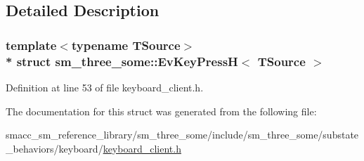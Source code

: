 \subsection{Detailed Description}
\subsubsection*{template$<$typename T\+Source$>$\\*
struct sm\+\_\+three\+\_\+some\+::\+Ev\+Key\+Press\+H$<$ T\+Source $>$}



Definition at line 53 of file keyboard\+\_\+client.\+h.



The documentation for this struct was generated from the following file\+:\begin{DoxyCompactItemize}
\item 
smacc\+\_\+sm\+\_\+reference\+\_\+library/sm\+\_\+three\+\_\+some/include/sm\+\_\+three\+\_\+some/substate\+\_\+behaviors/keyboard/\hyperlink{keyboard__client_8h}{keyboard\+\_\+client.\+h}\end{DoxyCompactItemize}
